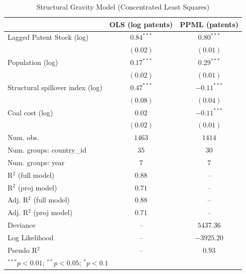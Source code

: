 
\begin{table}
\begin{center}
\begin{tabular}{l c c}
\hline
 & OLS (log patents) & PPML (patents) \\
\hline
Lagged Patent Stock (log)  & $0.84^{***}$ & $0.80^{***}$  \\
                           & $(0.02)$     & $(0.01)$      \\
Population (log)           & $0.17^{***}$ & $0.29^{***}$  \\
                           & $(0.02)$     & $(0.01)$      \\
Structural spillover index (log) & $0.47^{***}$ & $-0.11^{***}$ \\
                           & $(0.08)$     & $(0.04)$      \\
Coal cost (log)            & $0.02$       & $-0.11^{***}$ \\
                           & $(0.02)$     & $(0.01)$      \\
\hline
Num. obs.                  & $1463$       & $1414$        \\
Num. groups: country\_id   & $35$         & $30$          \\
Num. groups: year          & $7$          & $7$           \\
R$^2$ (full model)         & $0.88$       & --            \\
R$^2$ (proj model)         & $0.71$       & --            \\
Adj. R$^2$ (full model)    & $0.88$       & --            \\
Adj. R$^2$ (proj model)    & $0.71$       & --            \\
Deviance                   & --           & $5437.36$     \\
Log Likelihood             & --           & $-3925.20$    \\
Pseudo R$^2$               & --           & $0.93$        \\
\hline
\multicolumn{3}{l}{\scriptsize{$^{***}p<0.01$; $^{**}p<0.05$; $^{*}p<0.1$}}
\end{tabular}
\caption{Structural Gravity Model (Concentrated Least Squares)}
\label{tab:structural}
\end{center}
\end{table}
